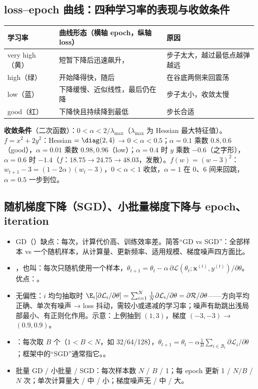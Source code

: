 \subsection{loss–epoch 曲线：四种学习率的表现与收敛条件}
\begin{center}\small
\begin{tabularx}{\linewidth}{@{}p{1.9cm}p{6.4cm}L@{}}
\toprule
学习率 & 曲线形态（横轴 epoch，纵轴 loss）& 原因 \\
\midrule
very high（黄）& 短暂下降后迅速飙升， & 步子太大，越过最低点越弹越远 \\
high（绿）& 开始降得快，随后 & 在谷底两侧来回震荡 \\
low（蓝）& 下降缓慢、近似线性，最后仍在降 & 步子太小，收敛太慢 \\
good（红）& 下降快且持续降到最低 & 步长合适 \\
\bottomrule
\end{tabularx}
\end{center}
\textbf{收敛条件}（二次函数）：$0<\alpha<2/\lambda_{\max}$（$\lambda_{\max}$ 为 Hessian 最大特征值）。$f=x^2+2y^2$：Hessian $=\diag(2,4)$ → $0<\alpha<0.5$；$\alpha=0.1$ 乘数 $0.8,0.6$（good），$\alpha=0.01$ 乘数 $0.98,0.96$（low）；$\alpha=0.4$ 时 $y$ 乘数 $-0.6$（之字形），$\alpha=0.6$ 时 $-1.4$（$f$：$18.75\to24.75\to48.03$，发散）。$f(w)=(w-3)^2$：$w_{t+1}-3=(1-2\alpha)(w_t-3)$，$0<\alpha<1$ 收敛，$\alpha=1$ 在 0、6 间来回跳，$\alpha=0.5$ 一步到位。

\subsection{随机梯度下降（SGD）、小批量梯度下降与 epoch、iteration}
\begin{itemize}
\item GD（）缺点：每次，计算代价高、训练效率差。简答“GD vs SGD”：全部样本 vs 一个随机样本，从计算量、更新频率、适用规模、梯度噪声四方面比。
\item {}，也叫：每次只随机使用一个样本，$\theta_{t+1}=\theta_t-\alpha\,\partial\mathcal L(\theta_t;\bm x^{(t)},y^{(t)})/\partial\theta$。优点：。
\item 无偏性：$i$ 均匀抽取时 $\E_i[\partial\mathcal L_i/\partial\theta]=\sum_{i=1}^N\frac1N\partial\mathcal L_i/\partial\theta=\partial\mathcal R/\partial\theta$——方向平均正确、单次有噪声 → loss 抖动，需较小或递减的学习率；噪声有助跳出浅局部最小、有正则化作用。示意：上例抽到 $(1,3)$，梯度 $(-3,-3)$ → $(0.9,0.9)$。
\item {}：每次取 $B$ 个（$1<B<N$，如 32/64/128），$\theta_{t+1}=\theta_t-\alpha\frac1B\sum_{i\in\mathcal B_t}\partial\mathcal L_i/\partial\theta$；框架中的“SGD”通常指它。。
\item 批量 GD / 小批量 / SGD：每次样本数 $N$ / $B$ / 1；每 epoch 更新 1 / $N/B$ / $N$ 次；单次计算量大 / 中 / 小；梯度噪声无 / 中 / 大。
\end{itemize}

